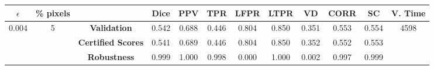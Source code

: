\begin{longtable}{ c  c | c | c  c  c  c  c  c  c c c}
\toprule \textbf{$\epsilon$} & \textbf{\% pixels} & & \textbf{Dice} & \textbf{PPV} & \textbf{TPR} & \textbf{LFPR} & \textbf{LTPR} & \textbf{VD} & \textbf{CORR} & \textbf{SC} & \textbf{V. Time} \\
\midrule 
\multirow{3}{*}{0.004}  & \multirow{3}{*}{5} &\textbf{Validation} & 0.542 & 0.688 & 0.446 & 0.804 & 0.850 & 0.351 & 0.553 & 0.554 & \multirow{3}{*}{4598} \\
 & & \textbf{Certified Scores} & 0.541 & 0.689 & 0.446 & 0.804 & 0.850 & 0.352 & 0.552 & 0.553 & \\
& & \textbf{Robustness} & 0.999 & 1.000 & 0.998 & 0.000 & 1.000 & 0.002 & 0.997 & 0.999 & \\
\end{longtable}